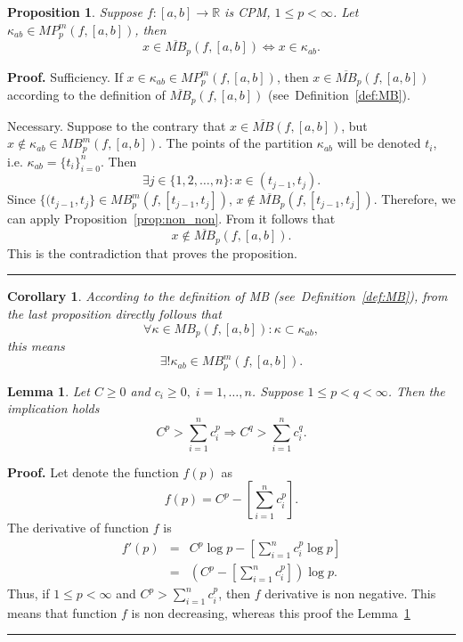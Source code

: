\documentclass[12pt, a4paper]{article}
\newtheorem{lemma}[theorem]{Lemma}
\newtheorem{proposition}[theorem]{Proposition}
\newtheorem{corollary}[theorem]{Corollary}
\newenvironment{proof}[1][Proof]{\noindent \textbf{#1.} }{\  \rule{0.5em}{0.5em}}
\numberwithin{equation}{section}
\begin{document}
\begin{proposition}\label{prop:E1Kappa}
  Suppose $f:[a,b] \rightarrow \mathbb{R}$ is CPM,
  $1 \leq p < \infty$. Let $\kappa_{ab} \in MP_{p}^m(f,[a,b])$, then
  \begin{equation}
  x \in \overline{MB}_{p}(f,[a,b]) \Leftrightarrow  x \in \kappa_{ab}.
  \end{equation}
\end{proposition}
\begin{proof}
  Sufficiency. If $x \in \kappa_{ab} \in MP_{p}^m(f,[a,b])$, then
  $x \in \overline{MB}_{p}(f,[a,b])$ according to the definition of  
  $\overline{MB}_{p}(f,[a,b])$ (see~Definition~\ref{def:MB}).
  
  Necessary. Suppose to the contrary that $x \in \overline{MB}(f,[a,b])$, 
  but $x \not \in \kappa_{ab} \in MB_{p}^m(f,[a,b])$.
  The points of the partition $\kappa_{ab}$ will be denoted $t_i$, i.e. $\kappa_{ab}=\{t_i\}_{i=0}^n$.
  Then
  $$ \exists j\in\{1,2,\dots,n\}:x \in (t_{j-1},t_j).$$
  Since $\{(t_{j-1},t_j\} \in MB_p^m(f,[t_{j-1},t_j])$,  $x \notin \overline{MB}_p(f,[t_{j-1},t_j])$.
  Therefore, we can apply Proposition~\ref{prop:non_non}. From it follows that  
  $$ x \notin \overline{MB}_{p}(f,[a,b]).$$
  This is the contradiction that proves the proposition.
\end{proof}
\begin{corollary} 
  According to the definition of MB (see~Definition~\ref{def:MB}),
  from the last proposition directly follows that  
  $$\forall \kappa \in MB_{p}(f,[a,b]): \kappa \subset \kappa_{ab}, $$
  this means
  $$\exists!\kappa_{ab} \in MB_{p}^m(f,[a,b]). $$
\end{corollary} 


\begin{lemma}\label{prop:Pmonoton}
  Let $C\geq0$ and $c_i\geq0,\;i=1,\dots,n$. Suppose $1 \leq p < q < \infty$. Then the implication holds
  $$C^p > \sum_{i=1}^n c_i^p  \Rightarrow C^q > \sum_{i=1}^n c_i^q. $$ 
\end{lemma}
\begin{proof}
  Let denote the function $f(p)$ as 
  $$f(p) = C^p - \left[ \sum_{i=1}^n c_i^p \right].$$
  The derivative of function $f$ is
  \begin{eqnarray*}
    f'(p) &=& C^p\log{p} - \left[ \sum_{i=1}^n c_i^p \log{p} \right] \\
            &=& \left(C^p - \left[ \sum_{i=1}^n c_i^p \right]\right)\log{p} .
  \end{eqnarray*}
  Thus, if $1 \leq p < \infty$ and $C^p > \sum_{i=1}^n c_i^p$, then 
  $f$ derivative is non negative. This means that function $f$ is non decreasing, 
  whereas this proof the Lemma~\ref{prop:Pmonoton}
\end{proof}
\end{document}
